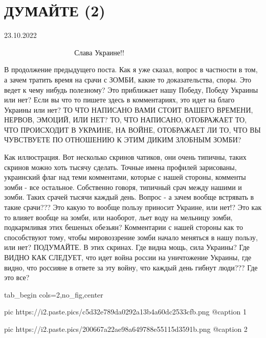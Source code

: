  
 
 
 
 

\section{ДУМАЙТЕ (2)}

23.10.2022

💛 💙 💛 💙 💛 💙 💛 💙 💛 💙 💛 💙 💛 💙 💛 💙                
Слава Украине!! 

В продолжение предыдущего поста. Как я уже сказал, вопрос в частности в том, а
зачем тратить время на срачи с ЗОМБИ, какие то доказательства, споры. Это ведет
к чему нибудь полезному? Это приближает нашу Победу, Победу Украины или нет?
Если вы что то пишете здесь в комментариях, это идет на благо Украины или нет?
ТО ЧТО НАПИСАНО ВАМИ СТОИТ ВАШЕГО ВРЕМЕНИ, НЕРВОВ, ЭМОЦИЙ, ИЛИ НЕТ? ТО, ЧТО
НАПИСАНО, ОТОБРАЖАЕТ ТО, ЧТО ПРОИСХОДИТ В УКРАИНЕ, НА ВОЙНЕ, ОТОБРАЖАЕТ ЛИ ТО,
ЧТО ВЫ ЧУВСТВУЕТЕ ПО ОТНОШЕНИЮ К ЭТИМ ДИКИМ ЗЛОБНЫМ ЗОМБИ?

Как иллюстрация. Вот несколько скринов чатиков, они очень типичны, таких
скринов можно хоть тысячу сделать. Точные имена профилей зарисованы, украинский
флаг над теми комментами, которые с нашей стороны, комменты зомби - все
остальное. Собственно говоря, типичный срач между нашими и зомби. Таких срачей
тысячи каждый день. Вопрос - а зачем вообще встрявать в такие срачи??? Это
какую то вообще пользу приносит Украине, или нет!? Это как то влияет вообще на
зомби, или наоборот, льет воду на мельницу зомби, подкармливая этих бешеных
обезьян? Комментарии с нашей стороны как то способствуют тому, чтобы
мировоззрение зомби начало меняться в нашу пользу, или нет? ПОДУМАЙТЕ. В этих
скринах. Где видна мощь, сила Украины? Где ВИДНО КАК СЛЕДУЕТ, что идет война
россии на уничтожение Украины, где видно, что россияне в ответе за эту войну,
что каждый день гибнут люди??? Где это все? 

\ifcmt
  tab_begin cols=2,no_fig,center

     pic https://i2.paste.pics/c5d32e789da0292a13b4a60dc2533cfb.png
		 @caption 1
		 
		 pic https://i2.paste.pics/200667a22ae98a649788e55115d3591b.png
		 @caption 2


